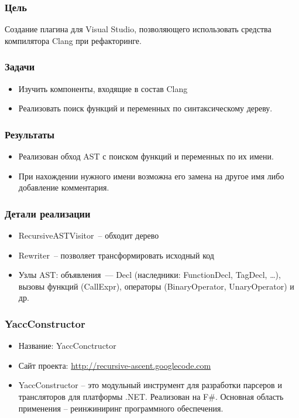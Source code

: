 \documentclass{beamer}
\begin{document}
\begin{frame}
\frametitle{Цель}
    Создание плагина для Visual Studio, позволяющего использовать средства компилятора Clang
при рефакторинге.
\end{frame}


\begin{frame}
\frametitle{Задачи}
    \begin{itemize}
        \item{Изучить компоненты, входящие в состав Clang}
        \item{Реализовать поиск функций и переменных по синтаксическому дереву.}
    \end{itemize}
\end{frame}


\begin{frame}
\frametitle{Результаты}
    \begin{itemize}
        \item{Реализован  обход AST с поиском функций и переменных по их имени.}
        \item{При нахождении нужного имени возможна его замена на другое имя либо добавление комментария.}
    \end{itemize}
\end{frame}

\begin{frame}
\frametitle{Детали реализации}
    \begin{itemize}
        \item{RecursiveASTVisitor~-- обходит дерево}
        \item{Rewriter~-- позволяет трансформировать исходный код}
        \item{Узлы AST: объявления~--- Decl (наследники: FunctionDecl, TagDecl, \ldots), вызовы функций (CallExpr), операторы (BinaryOperator, UnaryOperator) и др.}
    \end{itemize}
\end{frame}

\title[YaccConstructor]{}

\begin{frame}
	\transwipe[direction=90]
	\frametitle{YaccConstructor}
	\begin{itemize}
		\item Название: YaccConctructor
		\item Сайт проекта: \href{http://recursive-ascent.googlecode.com} {http://recursive-ascent.googlecode.com}
		\item YaccConstructor -- это модульный инструмент для разработки парсеров и трансляторов для платформы .NET. Реализован на F\#. Основная область применения -- реинжиниринг программного обеспечения.
	\end{itemize}
\end{frame}
\end{document}
